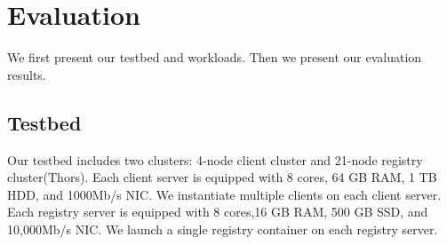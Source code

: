 \section{ Evaluation}
\label{sec:Evaluation}


We first present our testbed and workloads.
Then we present our evaluation results.
\subsection{Testbed}

Our testbed includes two clusters: 
4-node client cluster and
21-node registry cluster(Thors).
Each client server is equipped with 8 cores, 64 GB RAM, 1 TB HDD, and 1000Mb/s NIC.
We instantiate multiple clients on each client server.
Each registry server is equipped with 8 cores,16 GB RAM, 500 GB SSD, and 10,000Mb/s NIC. 
We launch a single registry container on each registry server.

